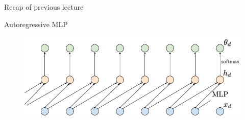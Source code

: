 \begin{frame}{Recap of previous lecture}
	\begin{block}{Autoregressive MLP}
		\vspace{-0.3cm}
 		\begin{figure}
		     \centering
		     \includegraphics[width=0.6\linewidth]{figs/sequential_MLP}
		 \end{figure}
	\end{block}
	\vspace{-0.3cm}


\end{frame}
